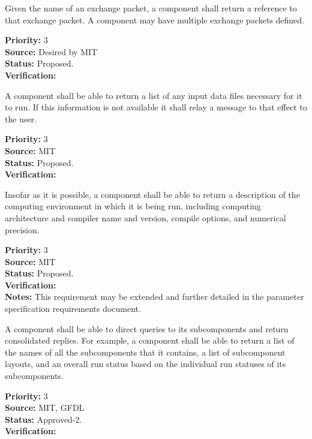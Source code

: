 Given the name of an exchange packet, a component shall return 
a reference to that exchange packet.  A component may have 
multiple exchange packets defined.
\begin{reqlist}
{\bf Priority:} 3\\
{\bf Source:} Desired by MIT \\
{\bf Status:} Proposed. \\
{\bf Verification:} 
\end{reqlist}

A component shall be able to return a list of any input 
data files necessary for it to run.  If this information is not
available it shall relay a message to that effect to the user.
\begin{reqlist}
{\bf Priority:} 3\\
{\bf Source:} MIT \\
{\bf Status:} Proposed.\\
{\bf Verification:} 
\end{reqlist}

Insofar as it is possible, a component shall be able to return 
a description of the computing environment in which it is being run, 
including computing architecture and compiler name and version, 
compile options, and numerical precision.  
\begin{reqlist}
{\bf Priority:} 3\\
{\bf Source:} MIT \\
{\bf Status:} Proposed.\\
{\bf Verification:} \\ 
{\bf Notes:} This requirement may be extended and further detailed
in the parameter specification requirements document.
\end{reqlist}

A component shall be able to direct queries to its subcomponents
and return consolidated replies.  For example,
a component shall be able to return a list of the names of all the
subcomponents that it contains, a list of subcomponent layouts,
and an overall run status based on the individual run statuses of 
its subcomponents.
\begin{reqlist}
{\bf Priority:} 3\\
{\bf Source:} MIT, GFDL \\
{\bf Status:} Approved-2.\\
{\bf Verification:} 
\end{reqlist}

